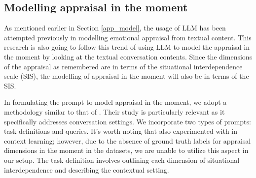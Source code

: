 \subsection{Modelling appraisal in the moment}

As mentioned earlier in Section \ref{app_model}, the usage of LLM has been attempted previously in modelling emotional appraisal from textual content. This research is also going to follow this trend of using LLM to model the appraisal in the moment by looking at the textual conversation contents. Since the dimensions of the appraisal as remembered are in terms of the situational interdependence scale (SIS), the modelling of appraisal in the moment will also be in terms of the SIS. 

In formulating the prompt to model appraisal in the moment, we adopt a methodology similar to that of \citeauthor{feng2023affect}\cite{feng2023affect}. Their study is particularly relevant as it specifically addresses conversation settings. We incorporate two types of prompts: task definitions and queries. It's worth noting that \citeauthor{feng2023affect} also experimented with in-context learning; however, due to the absence of ground truth labels for appraisal dimensions in the moment in the datasets, we are unable to utilize this aspect in our setup. The task definition involves outlining each dimension of situational interdependence and describing the contextual setting. 

